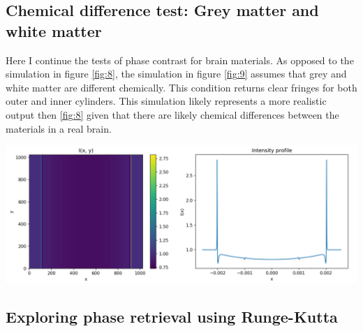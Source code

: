 \documentclass[10pt, a4paper, singlespacing]{report}
\newenvironment{Figure}
    {\par\medskip\noindent\minipage{\linewidth}}
    {\endminipage\par\medskip}
\begin{document}
\subsection{Chemical difference test: Grey matter and white matter}
Here I continue the tests of phase contrast for brain materials. As opposed to the simulation in figure \ref{fig:8}, the simulation in figure \ref{fig:9} assumes that grey and white matter are different chemically. This condition returns clear fringes for both outer and inner cylinders. This simulation likely represents a more realistic output then \ref{fig:8}
given that there are likely chemical differences between the materials in a real brain.
\begin{Figure}\label{fig:9}
\centering
\includegraphics[width=\linewidth]{optimistic_case.pdf}
\end{Figure}


\subsection{Exploring phase retrieval using Runge-Kutta}


\end{document}
